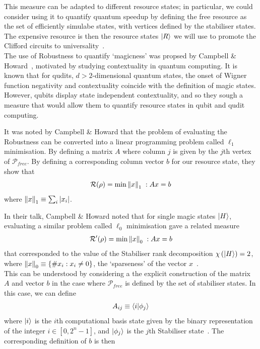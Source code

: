 \documentclass{standalone}
\begin{document}
This measure can be adapted to different resource states; in particular, we could consider using it to quantify quantum speedup by defining the free resource as the set of efficiently simulabe states, with vertices defined by the stabiliser states. The expensive resource is then the resource states $\ket{R}$ we will use to promote the Clifford circuits to universality~\cite{Howard2016}.\\
The use of Robustness to quantify `magicness' was propsed by Campbell \& Howard~\cite{Howard2016}, motivated by studying contextuality in quantum computing. It is known that for qudits, $d>2$-dimensional quantum states, the onset of Wigner function negativity and contextuality coincide with the definition of magic states. However, qubits display state independent contextuality, and so they sough a measure that would allow them to quantify resource states in qubit and qudit computing. 
\par
It was noted by Campbell \& Howard that the problem of evaluating the Robustness can be converted into a linear programming problem called $\ell_{1}$ minimisation. By defining a matrix $A$ where column $j$ is given by the $j$th vertex of $\mathcal{P}_{free}$. By defining a corresponding column vector $b$ for our resource state, they show that~\cite{Howard2016}
\begin{equation}
    \mathcal{R}(\rho)=\min \norm{x}_{1}\; : Ax=b
\end{equation}
where $\norm{x}_{1}\equiv\sum_{i}\vert x_{i}\vert$.
\par
In their talk, Campbell \& Howard noted that for single magic states $\ket{H}$, evaluating a similar problem called $\ell_{0}$ minimisation gave a related measure 
\begin{equation}
    \mathcal{R}'(\rho)=\min \norm{x}_{0}\; : Ax=b
\end{equation}
that corresponded to the value of the Stabiliser rank decomposition $\chi\left(\ket{H}\right)=2$, where $\norm{x}_{0}\equiv \{\# x_{i} : x_{i}\neq 0\}$, the `sparseness' of the vector $x$~\cite{Howard2016}.\\
This can be understood by considering a the explicit construction of the matrix $A$ and vector $b$ in the case where $\mathcal{P}_{free}$ is defined by the set of stabiliser states. In this case, we can define 
\begin{equation}
    A_{ij}\equiv\braket{i}{\phi_{j}}
\end{equation}
where $\ket{i}$ is the $i$th computational basis state given by the binary representation of the integer $i\in[0,2^{n}-1]$, and $\ket{\phi_{j}}$ is the $j$th Stabiliser state~\cite{Howard2016}. The corresponding definition of $b$ is then
\end{document}
